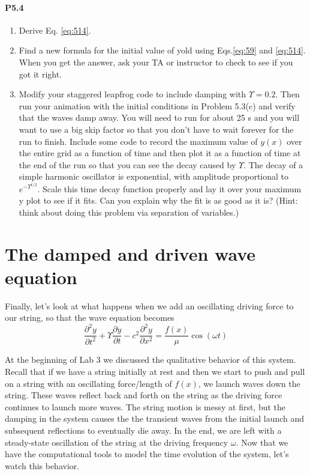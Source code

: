 \paragraph*{P5.4} 
\begin{enumerate}[label=(\alph*)]
	\item Derive Eq. \eqref{eq:514}.
	\item Find a new formula for the initial value of yold using Eqs.\eqref{eq:59} and
\eqref{eq:514}. When you get the answer, ask your TA or instructor to check to
see if you got it right.
\item Modify your staggered leapfrog code to include damping with $ \Upsilon = 0.2$.
Then run your animation with the initial conditions in Problem 5.3(c)
and verify that the waves damp away. You will need to run for about
25 s and you will want to use a big skip factor so that you don\rq t have
to wait forever for the run to finish. Include some code to record the
maximum value of $y(x)$ over the entire grid as a function of time and
then plot it as a function of time at the end of the run so that you can
see the decay caused by $\Upsilon$. The decay of a simple harmonic oscillator
is exponential, with amplitude proportional to $e^{−\Upsilon^{ t/2}}$. Scale this time
decay function properly and lay it over your maximum y plot to see if
it fits. Can you explain why the fit is as good as it is? (Hint: think about
doing this problem via separation of variables.)

\end{enumerate}
\section*{The damped and driven wave equation}
Finally, let\rq s look at what happens when we add an oscillating driving force to our
string, so that the wave equation becomes
\begin{equation}\label{eq:515}
\frac{\partial^2 y}{\partial t^2} + \Upsilon \frac{\partial y}{\partial t}-c^2\frac{\partial^2 y}{\partial x^2} = \frac{f(x)}{\mu} \cos(\omega t )
\end{equation}

At the beginning of Lab 3 we discussed the qualitative behavior of this system.
Recall that if we have a string initially at rest and then we start to push and pull on
a string with an oscillating force/length of $f(x)$, we launch waves down the string.
These waves reflect back and forth on the string as the driving force continues
to launch more waves. The string motion is messy at first, but the damping in
the system causes the the transient waves from the initial launch and subsequent
reflections to eventually die away. In the end, we are left with a steady-state
oscillation of the string at the driving frequency $\omega$.
Now that we have the computational tools to model the time evolution of the
system, let\rq s watch this behavior.
